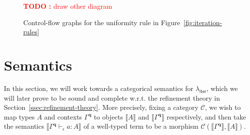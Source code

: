 \documentclass[acmsmall,screen,review]{acmart}
\newcounter{todos}
\newcommand{\TODO}[1]{{
  \stepcounter{todos}
  \begin{center}\large{\textcolor{red}{\textbf{TODO \arabic{todos}:} #1}}\end{center}
}}
\newcommand{\mc}[1]{\ensuremath{\mathcal{#1}}}
\newcommand{\mb}[1]{\ensuremath{\mathbf{#1}}}
\newcommand{\ms}[1]{\ensuremath{\mathsf{#1}}}
\newcommand{\hasty}[4]{#1 \vdash_{#2} #3: {#4}}
\newcommand{\tref}{\twoheadrightarrow}
\newcommand{\dnt}[1]{\llbracket{#1}\rrbracket}
\newcommand{\subiterexp}{\(\lambda_{\ms{iter}}\)}
\begin{document}
\begin{figure}
    \centering
  \TODO{draw other diagram}
  \caption{Control-flow graphs for the uniformity rule in Figure~\ref{fig:iteration-rules}}
  \Description{}
  \label{fig:unif-cfg}
\end{figure}

\section{Semantics}

In this section, we will work towards a categorical semantics for \subiterexp{}, which we will later
prove to be sound and complete w.r.t. the refinement theory in Section~\ref{ssec:refinement-theory}.
More precisely, fixing a category $\mc{C}$, we wish to map types $A$ and contexts $\Gamma^{\mb{q}}$
to objects $\dnt{A}$ and $\dnt{\Gamma^{\mb{q}}}$ respectively, and then take the semantics
$\dnt{\hasty{\Gamma^{\mb{q}}}{\epsilon}{a}{A}}$ of a well-typed term to be a morphism
$\mc{C}(\dnt{\Gamma^{\mb{q}}}, \dnt{A})$.
\end{document}
